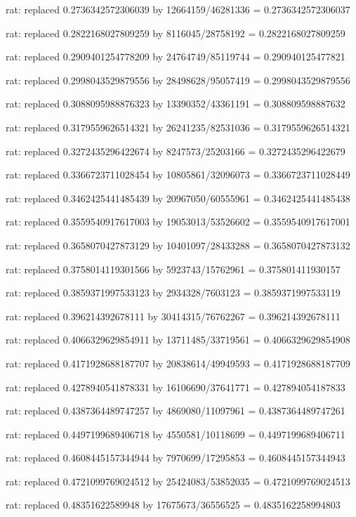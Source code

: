\documentclass[a4paper,10pt]{article}
\begin{document}
\begin{eulernotebook}
\begin{eulercomment}
\begin{eulercomment}
\begin{eulercomment}
\begin{eulercomment}
\begin{eulercomment}
\begin{eulercomment}
\begin{eulercomment}
\begin{eulercomment}
\begin{eulercomment}
\begin{eulercomment}
\begin{eulercomment}
\begin{eulercomment}
\begin{eulercomment}
\begin{eulercomment}
\begin{eulercomment}
\begin{eulercomment}
\begin{euleroutput}
  rat: replaced 0.2736342572306039 by 12664159/46281336 = 0.2736342572306037
  
  rat: replaced 0.2822168027809259 by 8116045/28758192 = 0.2822168027809259
  
  rat: replaced 0.2909401254778209 by 24764749/85119744 = 0.290940125477821
  
  rat: replaced 0.2998043529879556 by 28498628/95057419 = 0.2998043529879556
  
  rat: replaced 0.3088095988876323 by 13390352/43361191 = 0.308809598887632
  
  rat: replaced 0.3179559626514321 by 26241235/82531036 = 0.3179559626514321
  
  rat: replaced 0.3272435296422674 by 8247573/25203166 = 0.3272435296422679
  
  rat: replaced 0.3366723711028454 by 10805861/32096073 = 0.3366723711028449
  
  rat: replaced 0.3462425441485439 by 20967050/60555961 = 0.3462425441485438
  
  rat: replaced 0.3559540917617003 by 19053013/53526602 = 0.3559540917617001
  
  rat: replaced 0.3658070427873129 by 10401097/28433288 = 0.3658070427873132
  
  rat: replaced 0.3758014119301566 by 5923743/15762961 = 0.375801411930157
  
  rat: replaced 0.3859371997533123 by 2934328/7603123 = 0.3859371997533119
  
  rat: replaced 0.396214392678111 by 30414315/76762267 = 0.396214392678111
  
  rat: replaced 0.4066329629854911 by 13711485/33719561 = 0.4066329629854908
  
  rat: replaced 0.4171928688187707 by 20838614/49949593 = 0.4171928688187709
  
  rat: replaced 0.4278940541878331 by 16106690/37641771 = 0.427894054187833
  
  rat: replaced 0.4387364489747257 by 4869080/11097961 = 0.4387364489747261
  
  rat: replaced 0.4497199689406718 by 4550581/10118699 = 0.4497199689406711
  
  rat: replaced 0.4608445157344944 by 7970699/17295853 = 0.4608445157344943
  
  rat: replaced 0.4721099769024512 by 25424083/53852035 = 0.4721099769024513
  
  rat: replaced 0.48351622589948 by 17675673/36556525 = 0.4835162258994803
  

\end{euleroutput}
\end{eulercomment}
\end{eulercomment}
\end{eulercomment}
\end{eulercomment}
\end{eulercomment}
\end{eulercomment}
\end{eulercomment}
\end{eulercomment}
\end{eulercomment}
\end{eulercomment}
\end{eulercomment}
\end{eulercomment}
\end{eulercomment}
\end{eulercomment}
\end{eulercomment}
\end{eulercomment}
\end{eulernotebook}
\end{document}
